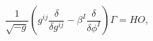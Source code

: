\begin{equation}
\frac{1}{\sqrt{-g}}\left( g^{ij}
{\frac{\delta }{\delta g^{ij}}} - \beta^I \frac{\delta}{\delta
\phi^I}\right) \Gamma = HO,
\end{equation}

